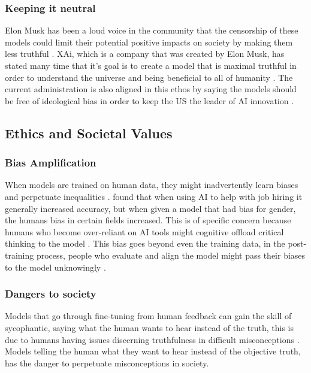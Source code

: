 \subsubsection{Keeping it neutral}

Elon Musk has been a loud voice in the community that the censorship of these models could limit their potential positive impacts on society by making them less truthful \citep{perrigo_elon_2023}. XAi, which is a company that was created by Elon Musk, has stated many time that it's goal is to create a model that is maximal truthful in order to understand the universe and being beneficial to all of humanity \citep{xai_series_2024}. The current administration is also aligned in this ethos by saying the models should be free of ideological bias in order to keep the US the leader of AI innovation \citep{whitehouse_removing_2025}.

\subsection{Ethics and Societal Values}

\subsubsection{Bias Amplification}

When models are trained on human data, they might inadvertently learn biases and perpetuate inequalities \citep{ji_ai_2023}. \cite{peng_investigations_2022} found that when using AI to help with job hiring it generally increased accuracy, but when given a model that had bias for gender, the humans bias in certain fields increased. This is of specific concern because humans who become over-reliant on AI tools might cognitive offload critical thinking to the model \citep{gerlich_ai_2025}. This bias goes beyond even the training data, in the post-training process, people who evaluate and align the model might pass their biases to the model unknowingly \citep{openai_gpt_4_2023}.

\subsubsection{Dangers to society}

Models that go through fine-tuning from human feedback can gain the skill of sycophantic, saying what the human wants to hear instead of the truth, this is due to humans having issues discerning truthfulness in difficult misconceptions \citep{sharma_towards_2023}. Models telling the human what they want to hear instead of the objective truth, has the danger to perpetuate misconceptions in society.


